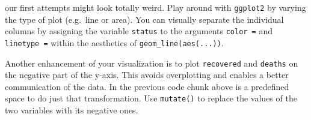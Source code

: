 \documentclass[
  11pt,
]{article}
\newenvironment{tips}[1]
  {
  \begin{itemize}
  \footnotesize
  \renewcommand{\labelitemi}{
    \raisebox{-.7\height}[0pt][0pt]{
      {\setkeys{Gin}{width=3em,keepaspectratio}
        \texttt{[image: images/\#1.png]}}
    }
  }
  \setlength{\fboxsep}{1em}
  \begin{rbox}
  \item
  }
  {
  \end{rbox}
  \end{itemize}
  }
\begin{document}
\begin{tips}
Your first attempts might look totally weird. Play around with \texttt{ggplot2} by varying the type of plot (e.g.~line or area). You can visually separate the individual columns by assigning the variable \texttt{status} to the arguments \texttt{color\ =} and \texttt{linetype\ =} within the aesthetics of \texttt{geom\_line(aes(...))}.

Another enhancement of your visualization is to plot \texttt{recovered} and \texttt{deaths} on the negative part of the y-axis. This avoids overplotting and enables a better communication of the data. In the previous code chunk above is a predefined space to do just that transformation. Use \texttt{mutate()} to replace the values of the two variables with its negative ones.

\end{tips}
\end{document}
